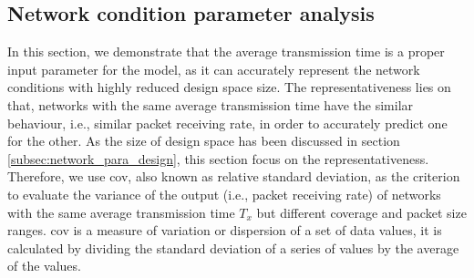 
\subsection{Network condition parameter analysis \label{subsubsec:txselection}}

In this section, we demonstrate that the average transmission time 
is a proper input parameter for the model, as it can accurately represent the network conditions with highly reduced design space size. The representativeness lies on that, networks with the same average transmission time have the similar behaviour, i.e., similar packet receiving rate, in order to accurately predict one for the other. As the size of design space has been discussed in section \ref{subsec:network_para_design}, this section focus on the representativeness. 
Therefore, we use \gls{cov}, also known as relative standard deviation, as the criterion to evaluate the variance of the output (i.e., packet receiving rate)  of networks with the same average transmission time $T_x$ but different coverage and packet size ranges. \gls{cov} is a measure of variation or dispersion of a set of data values, it is calculated by dividing the standard deviation of a series of values by the average of the values.









